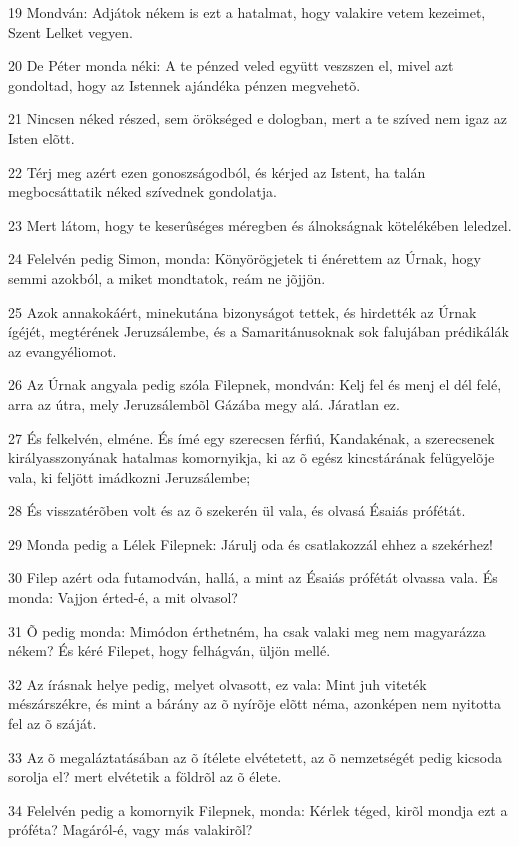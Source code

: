 \par 19 Mondván: Adjátok nékem is ezt a hatalmat, hogy valakire vetem kezeimet, Szent Lelket vegyen.
\par 20 De Péter monda néki: A te pénzed veled együtt veszszen el, mivel azt gondoltad, hogy az Istennek ajándéka pénzen megvehetõ.
\par 21 Nincsen néked részed, sem örökséged e dologban, mert a te szíved nem igaz az Isten elõtt.
\par 22 Térj meg azért ezen gonoszságodból, és kérjed az Istent, ha talán megbocsáttatik néked szívednek gondolatja.
\par 23 Mert látom, hogy te keserûséges méregben és álnokságnak kötelékében leledzel.
\par 24 Felelvén pedig Simon, monda: Könyörögjetek ti énérettem az Úrnak, hogy semmi azokból, a miket mondtatok, reám ne jõjjön.
\par 25 Azok annakokáért, minekutána bizonyságot tettek, és hirdették az Úrnak ígéjét, megtérének Jeruzsálembe, és a Samaritánusoknak sok falujában prédikálák az evangyéliomot.
\par 26 Az Úrnak angyala pedig szóla Filepnek, mondván: Kelj fel és menj el dél felé, arra az útra, mely Jeruzsálembõl Gázába megy alá. Járatlan ez.
\par 27 És felkelvén, elméne. És ímé egy szerecsen férfiú, Kandakénak, a szerecsenek királyasszonyának hatalmas komornyikja, ki az õ egész kincstárának felügyelõje vala, ki feljött imádkozni Jeruzsálembe;
\par 28 És visszatérõben volt és az õ szekerén ül vala, és olvasá Ésaiás prófétát.
\par 29 Monda pedig a Lélek Filepnek: Járulj oda és csatlakozzál ehhez a szekérhez!
\par 30 Filep azért oda futamodván, hallá, a mint az Ésaiás prófétát olvassa vala. És monda: Vajjon érted-é, a mit olvasol?
\par 31 Õ pedig monda: Mimódon érthetném, ha csak valaki meg nem magyarázza nékem? És kéré Filepet, hogy felhágván, üljön mellé.
\par 32 Az írásnak helye pedig, melyet olvasott, ez vala: Mint juh viteték mészárszékre, és mint a bárány az õ nyírõje elõtt néma, azonképen nem nyitotta fel az õ száját.
\par 33 Az õ megaláztatásában az õ ítélete elvétetett, az õ nemzetségét pedig kicsoda sorolja el? mert elvétetik a földrõl az õ élete.
\par 34 Felelvén pedig a komornyik Filepnek, monda: Kérlek téged, kirõl mondja ezt a próféta? Magáról-é, vagy más valakirõl?
